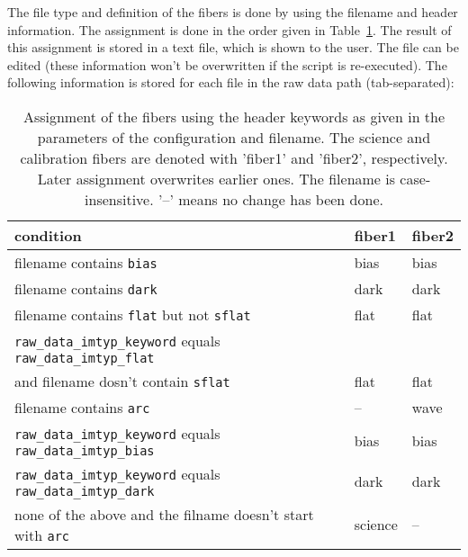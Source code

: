 \documentclass[10pt,a4paper]{article}
\begin{document}
\noindent The file type and definition of the fibers is done by using the filename and header information. The assignment is done in the order given in Table~\ref{Tab:fiber_definition}. The result of this assignment is stored in a text file, which is shown to the user. The file can be edited (these information won't be overwritten if the script is re-executed). The following information is stored for each file in the raw data path (tab-separated):
\begin{table}
 \caption{Assignment of the fibers using the header keywords as given in the parameters of the configuration and filename. The science and calibration fibers are denoted with 'fiber1' and 'fiber2', respectively. Later assignment overwrites earlier ones. The filename is case-insensitive. '--' means no change has been done.}
 \label{Tab:fiber_definition}
 \begin{tabular}{l l l}
 \small
 condition 															& fiber1 & fiber2 \\
 \hline
 filename contains \verb|bias|										& bias	& bias \\
 filename contains \verb|dark|										& dark	& dark \\
 filename contains \verb|flat| but not \verb|sflat| 				& flat	& flat \\
 \verb|raw_data_imtyp_keyword| equals \verb|raw_data_imtyp_flat| 	&       & \\
 \hspace{1cm} and filename dosn't contain \verb|sflat| 				& flat  & flat \\
 filename contains \verb|arc|						   				& -- 	& wave \\
 \verb|raw_data_imtyp_keyword| equals \verb|raw_data_imtyp_bias| 	& bias	& bias \\
 \verb|raw_data_imtyp_keyword| equals \verb|raw_data_imtyp_dark| 	& dark	& dark \\
 none of the above and the filname doesn't start with \verb|arc|  & science & --   \\
 \end{tabular}
\end{table}
\end{document}
